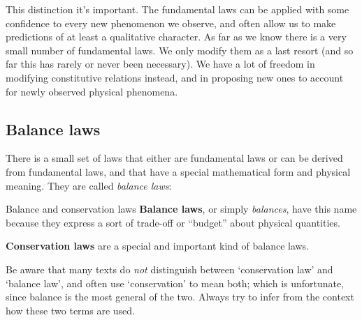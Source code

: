 \documentclass[a4paper,12pt,%
onecolumn,oneside,titlepage,%
british%
]{memoir}
\renewcommand*{\|}[1][]{\nonscript\:#1\vert\nonscript\:\mathopen{}}
\begin{document}
This distinction it's important. The fundamental laws can be applied with some confidence to every new phenomenon we observe, and often allow us to make predictions of at least a qualitative character. As far as we know there is a very small number of fundamental laws. We only modify them as a last resort (and so far this has rarely or never been necessary). We have a lot of freedom in modifying constitutive relations instead, and in proposing new ones to account for newly observed physical phenomena.

\subsection{Balance laws}
\label{sec:balance_intro}

There is a small set of laws that either are fundamental laws or can be derived from fundamental laws, and that have a special mathematical form and physical meaning. They are called \emph{balance laws}:
\begin{definition}{Balance and conservation laws}
  \textbf{Balance laws}, or simply \emph{balances}, have this name because they express a sort of trade-off or \enquote{budget} about physical quantities.

  \textbf{Conservation laws} are a special and important kind of balance laws.
\end{definition}
%


\begin{warning}\label{wa:conservation}
  Be aware that many texts do \emph{not} distinguish between \enquote*{conservation law} and \enquote*{balance law}, and often use \enquote*{conservation} to mean both; which is unfortunate, since balance is the most general of the two. Always try to infer from the context how these two terms are used.
\end{warning}
\end{document}
